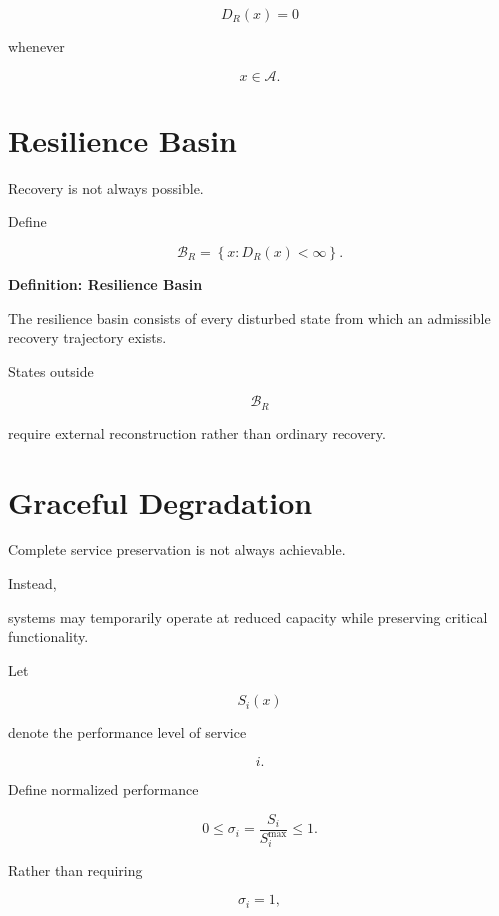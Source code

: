 \documentclass[11pt,fleqn]{book}
\numberwithin{equation}{chapter}
\newenvironment{definition}[1]
  {\begin{definitionEnv}
   \noindent\textbf{Definition: #1}\par\smallskip}
  {\end{definitionEnv}}
\theoremstyle{plain}
\theoremstyle{definition}
\theoremstyle{remark}
\begin{document}
\[
D_R(x)=0
\]

whenever

\[
x\in\mathcal A.
\]


\section{Resilience Basin}

Recovery is not always possible.

Define

\[
\mathcal B_R
=
\left\{
x:
D_R(x)<\infty
\right\}.
\]


\begin{definition}{Resilience Basin}

The resilience basin consists of every disturbed state from which an
admissible recovery trajectory exists.

\end{definition}

States outside

\[
\mathcal B_R
\]

require external reconstruction rather than ordinary recovery.


\section{Graceful Degradation}

Complete service preservation is not always achievable.

Instead,

systems may temporarily operate at reduced capacity while preserving
critical functionality.

Let

\[
S_i(x)
\]

denote the performance level of service

\[
i.
\]

Define normalized performance

\[
0
\le
\sigma_i
=
\frac{S_i}{S_i^{\max}}
\le
1.
\]


Rather than requiring

\[
\sigma_i=1,
\]
\end{document}
